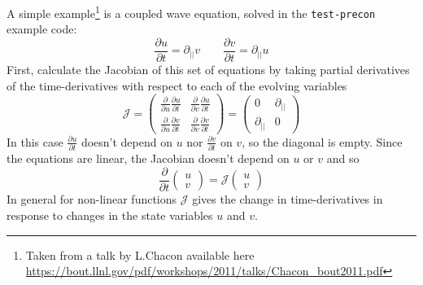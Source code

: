 \documentclass[12pt]{article}
\begin{document}
A simple example\footnote{Taken from a talk by L.Chacon available here \url{https://bout.llnl.gov/pdf/workshops/2011/talks/Chacon_bout2011.pdf}} is a coupled wave equation, solved in the \texttt{test-precon} example code:
\[
\frac{\partial u}{\partial t} = \partial_{||}v \qquad \frac{\partial v}{\partial t} = \partial_{||} u
\]
First, calculate the Jacobian of this set of equations by taking partial derivatives of the time-derivatives with respect to each of the evolving variables
\[
\mathcal{J} = \left(\begin{array}{cc}
\frac{\partial}{\partial u}\frac{\partial u}{\partial t} & \frac{\partial}{\partial v}\frac{\partial u}{\partial t}\\
\frac{\partial}{\partial u}\frac{\partial v}{\partial t} & \frac{\partial}{\partial v}\frac{\partial v}{\partial t}
\end{array}\right) = \left(\begin{array}{cc}
0 & \partial_{||} \\
\partial_{||} & 0
\end{array}\right)
\]
In this case $\frac{\partial u}{\partial t}$ doesn't depend on $u$ nor $\frac{\partial v}{\partial t}$ on $v$,
so the diagonal is empty. Since the equations are linear, the Jacobian doesn't depend on $u$ or $v$ and so
\[
\frac{\partial}{\partial t}\left(\begin{array}{c}
u \\
v
\end{array}\right) = \mathcal{J} \left(\begin{array}{c}
u \\
v
\end{array}\right)
\]
In general for non-linear functions $\mathcal{J}$ gives the change in
time-derivatives in response to changes
in the state variables $u$ and $v$.
\end{document}
